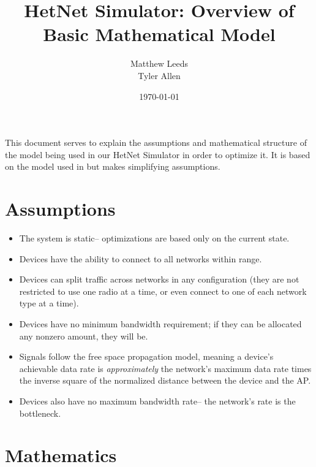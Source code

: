 \documentclass[11pt]{article}
\title{HetNet Simulator: Overview of Basic Mathematical Model}
\author{Matthew Leeds\\
		Tyler Allen\\}
\date{\today}
\begin{document}
\maketitle
This document serves to explain the assumptions and mathematical structure of the model being used in our HetNet Simulator in order to optimize it. It is based on the model used in \cite{amin13} but makes simplifying assumptions.
\section{Assumptions}

\begin{itemize}
\item The system is static-- optimizations are based only on the current state.
\item Devices have the ability to connect to all networks within range.
\item Devices can split traffic across networks in any configuration (they are not restricted to use one radio at a time, or even connect to one of each network type at a time).
\item Devices have no minimum bandwidth requirement; if they can be allocated any nonzero amount, they will be.
\item Signals follow the free space propagation model, meaning a device's achievable data rate is \textit{approximately} the network's maximum data rate times the inverse square of the normalized distance between the device and the AP. 
\item Devices also have no maximum bandwidth rate-- the network's rate is the bottleneck.
\end{itemize}

\section{Mathematics}
\end{document}
